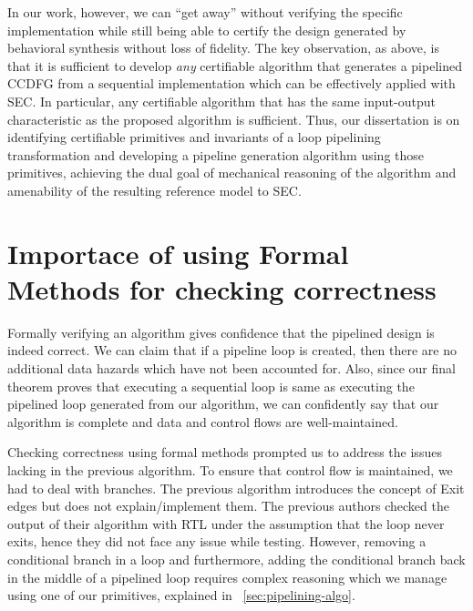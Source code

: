 
In our work, however, we can ``get away'' without verifying
the specific implementation while still being able to
certify the design generated by behavioral synthesis without
loss of fidelity. The key observation, as above, is that it
is sufficient to develop {\em any} certifiable algorithm
that generates a pipelined CCDFG from a sequential
implementation which can be effectively applied with SEC.
In particular, any certifiable algorithm that has the same
input-output characteristic as the proposed algorithm
is sufficient.  Thus, our dissertation is on identifying
certifiable primitives and invariants of a loop pipelining
transformation and developing a pipeline generation
algorithm using those primitives, achieving the dual goal of
mechanical reasoning of the algorithm and amenability of the
resulting reference model to SEC.

\section{Importace of using Formal Methods for checking correctness}

Formally verifying an algorithm gives confidence that the pipelined design is indeed correct. We can claim that if a pipeline loop is created, then there are no additional data hazards which have not been accounted for. Also, since our final theorem proves that executing a sequential loop is same as executing the pipelined loop generated from our algorithm, we can confidently say that our algorithm is complete and data and control flows are well-maintained.   

Checking correctness using formal methods prompted us to address the issues lacking in the previous algorithm. To ensure that control flow is maintained, we had to deal with branches. The previous algorithm introduces the concept of Exit edges but does not explain/implement them. The previous authors checked the output of their algorithm with RTL under the assumption that the loop never exits, hence they did not face any issue while testing. However, removing a conditional branch in a loop and furthermore, adding the conditional branch back in the middle of a pipelined loop requires complex reasoning which we manage using one of our primitives, explained in ~\ref{sec:pipelining-algo}.

